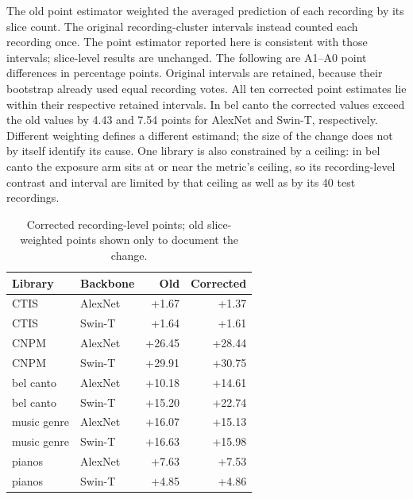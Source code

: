 The old point estimator weighted the averaged prediction of each recording by its slice count. The original recording-cluster intervals instead counted each recording once. The point estimator reported here is consistent with those intervals; slice-level results are
unchanged. The following are A1--A0 point differences in percentage points. Original intervals are retained, because their bootstrap already used equal recording votes. All ten corrected point estimates lie within their respective retained intervals. In bel canto the corrected values exceed the old values by 4.43 and 7.54 points for AlexNet and Swin-T, respectively. Different weighting defines a different estimand; the size of the change does not by itself identify its cause. One library is also constrained by a ceiling: in bel canto the exposure arm sits at or near the metric's ceiling, so its recording-level contrast
and interval are limited by that ceiling as well as by its 40 test recordings.

\begin{table}[ht]\centering\small\caption{Corrected recording-level points; old slice-weighted points shown only to document the change.}

\begin{tabular}{llrr}\toprule Library & Backbone & Old & Corrected \\ \midrule

CTIS & AlexNet & +1.67 & +1.37 \\

CTIS & Swin-T & +1.64 & +1.61 \\

CNPM & AlexNet & +26.45 & +28.44 \\

CNPM & Swin-T & +29.91 & +30.75 \\

bel canto & AlexNet & +10.18 & +14.61 \\

bel canto & Swin-T & +15.20 & +22.74 \\

music genre & AlexNet & +16.07 & +15.13 \\

music genre & Swin-T & +16.63 & +15.98 \\

pianos & AlexNet & +7.63 & +7.53 \\

pianos & Swin-T & +4.85 & +4.86 \\

\bottomrule\end{tabular}\end{table}


